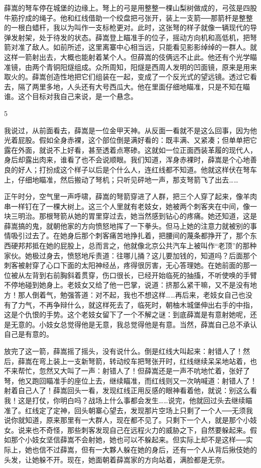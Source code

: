 薛嵩的弩车停在城堡的边缘上。弩上的弓是用整整一棵山梨树做成的，弓弦是四股牛筋拧成的绳子。他和红线借助一个绞盘把弓张开，装上一支箭──那箭杆是整整的一根白蜡杆，我以为叫作一支标枪更对。此时，这张弩的样子就像一辆现代的导弹发射架，处于待发的状态。薛嵩登上瞄准手的位子，摇动方向机和高低机，把弩箭对准了敌人。如前所述，这里离寨中心相当远，只能看见影影绰绰的一群人。就这样一箭射出去，大概也能射着某个人。但薛嵩的伎俩远不止此。他还有个光学瞄准镜，由两个青铜阳燧组成。众所周知，阳燧是西周人发明的凹面镜，原来是用来取火的。薛嵩创造性地把它们组装在一起，变成了一个反光式的望远镜。透过它看去，隔了两里多地，人头还有大号西瓜大。他在里面仔细地瞄准，只是不知在瞄谁。这个目标对我自己来说，是一个悬念。 

5 

我说过，从前面看去，薛嵩是一位金甲天神。从反面一看就不是这么回事，因为他光着屁股。假如全身赤裸，这个部位倒是满好看的：既丰满、又紧凑；但单单把它露在外面，就说不上好看，甚至透着点寒碜。这就如一位正面西装革履的现代人，身后却露出肉来，谁看了也不会说顺眼。我们知道，浑身赤裸时，薛嵩是个心地善良的好人；打扮成这个样子以后是个什么人，连红线都不知道。他就这样伏在弩车上，仔细地瞄准，然后搬动了弩机；只听见砰地一声，那支弩箭飞了出去…… 

正午时分，空气里一声呼啸，薛嵩的弩箭穿进了人群，把三个人穿了起来，像羊肉串一样钉在了一棵大树上。这三个人里就有老妓女，她被两个刺客夹在中间，像一块三明治。那根弩箭从她的胃里穿过去，她当然感到钻心的疼痛。她还知道，这是薛嵩搞的鬼，就朝他家的方向愤怒地挥了一下拳头。但马上她的注意力就被别的事情吸引过去了。在她身后那个刺客痛苦地挣扎着，把腰间的蔑条都挣开了，那个东西硬邦邦抵在她的屁股上，总而言之，他就像北京公共汽车上被叫作“老顶”的那种家伙。她极过身去，愤怒地斥责道：往哪儿捅？这儿要加钱的，知道吗？后面那个刺客被射穿了心口下面的太阳神经丛，疼得很厉害，无心答理她。在她前面的那一位被从左背到右前胸斜着贯穿，伤口很长，已经开始临死的抽搐，不听使唤的手臂不停地碰到她身上。老妓女又给了他一巴掌，说道：挤那么紧干嘛，又不是没有地方！那人倒着气，勉强答道：对不起，我也不想这样……再后来，老妓女自己也没有了力气，不再争辩什么，就这样死去了，临死时，朝柚木城堡伸出右手的中指，这是个仇恨的手势。这个老妓女留下了一个不解之谜：到底薛嵩是有意射她呢，还是无意的。小妓女总觉得他是无意，我总觉得他是有意。当然，薛嵩自己总不承认自己是有意的。 

放完了这一箭，薛嵩摇了摇头，没有说什么。倒是红线大叫起来：射错人了！然后，薛嵩在弯上装上一支新弩箭，转动绞车把弩张开时，红线继续呆呆地站着，也不来帮忙，忽然又大叫了一声：射错人了！但薛嵩还是一声不吭地忙着，张好了弩，他又跑回瞄准手的座位上去，继续瞄准，而红线则又一次呐喊道：射错人了！射着自己人了！薛嵩回头一看，发现红线正用反感的眼神看着他，就说：别这么看我！这是打仗，你明白吗？战场上什么事都会发生……说完，他就回过头去继续瞄准了。红线定了定神，回头朝寨心望去，发现那片空场上只剩了一个人──无须我说你就知道，原来那里有一大群人，现在都不见了。只剩下一个人，就是那个小妓女。说来也不奇怪，那些刺客发现自己在远程火力的威胁之下，自然要躲起来。假如那个小妓女坚信薛嵩不会射她，她也可以不躲起来。但实际上却不是这样──实际上，她也信不过薛嵩，但有一大夥人躲在她的身后，还有一个人从背后揪伎她的头发，让她躲不开。现在，她面朝着薛嵩家的方向站着，满脸都是无奈。 

